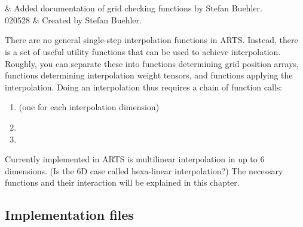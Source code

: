 \graphicspath{{Figs/interpolation/}}
%
%
\chapter{}
\label{sec:interpolation}


%
%
 & Added documentation of grid checking functions by Stefan Buehler.\\
  020528 & Created by Stefan Buehler.\\
\stophistory




%
%

There are no general single-step interpolation functions in ARTS.
Instead, there is a set of useful utility functions that can be used
to achieve interpolation. Roughly, you can separate these into
functions determining grid position arrays, functions determining
interpolation weight tensors, and functions applying the
interpolation. Doing an interpolation thus requires a chain of
function calls:
\begin{enumerate}
\item {} (one for each interpolation dimension)
\item {}
\item {}
\end{enumerate}
Currently implemented in ARTS is multilinear interpolation in up to 6
dimensions. (Is the 6D case called hexa-linear interpolation?)  The
necessary functions and their interaction will be explained in this
chapter.

\section{Implementation files}

